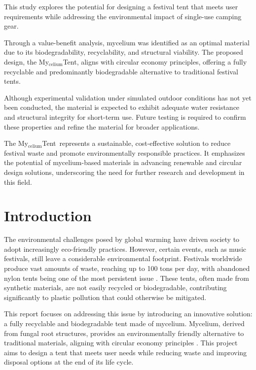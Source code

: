 \documentclass{article}
\newcommand{\myc}{My$_{\text{celium}}$Tent}
\begin{document}
This study explores the potential for designing a festival tent that
meets user requirements while addressing the environmental impact of
single-use camping gear.  

Through a value-benefit analysis, mycelium was identified as an
optimal material due to its biodegradability, recyclability, and
structural viability. The proposed design, the \myc,
aligns with circular economy principles, offering a fully recyclable
and predominantly biodegradable alternative to traditional festival
tents. 

Although experimental validation under simulated outdoor conditions
has not yet been conducted, the material is expected to exhibit
adequate water resistance and structural integrity for short-term use.
Future testing is required to confirm these properties and refine the
material for broader applications. 

The \myc\ represents a sustainable, cost-effective solution to
reduce festival waste and promote environmentally responsible
practices. It emphasizes the potential of mycelium-based materials in
advancing renewable and circular design solutions, underscoring the
need for further research and development in this field.

\newpage
\tableofcontents
\thispagestyle{empty}

\newpage
\section{Introduction}
The environmental challenges posed by global warming have driven society to adopt
increasingly eco-friendly practices. However, certain events, such as music festivals,
still leave a considerable environmental footprint. Festivals worldwide produce vast
amounts of waste, reaching up to 100 tons per day, with abandoned nylon tents being one
of the most persistent issue \parencite{Gray2019}. These tents, often made
from synthetic materials, are not easily recycled or biodegradable, contributing
significantly to plastic pollution that could otherwise be mitigated.

This report focuses on addressing this issue by introducing an innovative solution: a
fully recyclable and biodegradable tent made of mycelium. Mycelium, derived from fungal
root structures, provides an environmentally friendly alternative to traditional materials,
aligning with circular economy principles \parencite{attias}. This project
aims to design a tent that meets user needs while reducing waste and improving disposal
options at the end of its life cycle.
\end{document}
